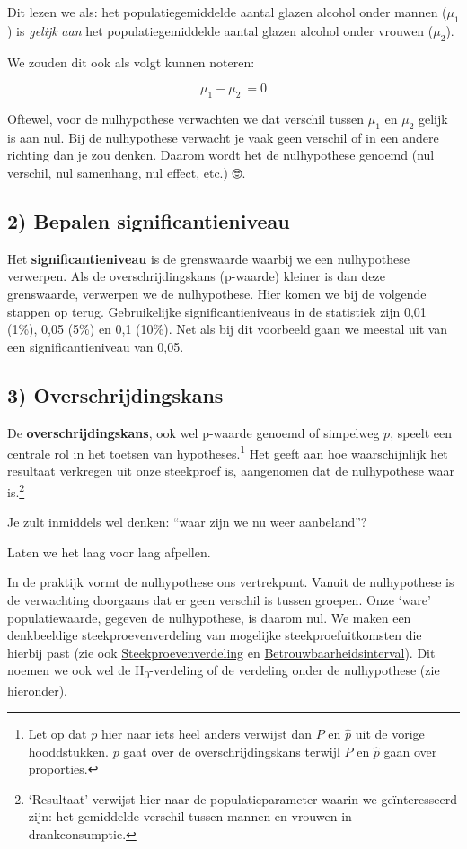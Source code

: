 \documentclass[
  letterpaper,
  DIV=11,
  numbers=noendperiod]{scrreprt}
\begin{document}
Dit lezen we als: het populatiegemiddelde aantal glazen alcohol onder
mannen (\(\mu_1\)) is \emph{gelijk} \emph{aan} het populatiegemiddelde
aantal glazen alcohol onder vrouwen (\(\mu_2\)).

We zouden dit ook als volgt kunnen noteren:

\[\mu_1-\mu_2\ = 0\]

Oftewel, voor de nulhypothese verwachten we dat verschil tussen
\(\mu_1\) en \(\mu_2\) gelijk is aan nul. Bij de nulhypothese verwacht
je vaak geen verschil of in een andere richting dan je zou denken.
Daarom wordt het de nulhypothese genoemd (nul verschil, nul samenhang,
nul effect, etc.) 🤓.

\subsection{2) Bepalen
significantieniveau}\label{bepalen-significantieniveau}

Het \textbf{significantieniveau} is de grenswaarde waarbij we een
nulhypothese verwerpen. Als de overschrijdingskans (p-waarde) kleiner is
dan deze grenswaarde, verwerpen we de nulhypothese. Hier komen we bij de
volgende stappen op terug. Gebruikelijke significantieniveaus in de
statistiek zijn 0,01 (1\%), 0,05 (5\%) en 0,1 (10\%). Net als bij dit
voorbeeld gaan we meestal uit van een significantieniveau van 0,05.

\subsection{3) Overschrijdingskans}\label{sec-overschrijdingskans}

De \textbf{overschrijdingskans}, ook wel p-waarde genoemd of simpelweg
\(p\), speelt een centrale rol in het toetsen van hypotheses.\footnote{Let
  op dat \(p\) hier naar iets heel anders verwijst dan \(P\) en
  \(\hat{p}\) uit de vorige hooddstukken. \(p\) gaat over de
  overschrijdingskans terwijl \(P\) en \(\hat{p}\) gaan over proporties.}
Het geeft aan hoe waarschijnlijk het resultaat verkregen uit onze
steekproef is, aangenomen dat de nulhypothese waar is.\footnote{`Resultaat'
  verwijst hier naar de populatieparameter waarin we geïnteresseerd
  zijn: het gemiddelde verschil tussen mannen en vrouwen in
  drankconsumptie.}

Je zult inmiddels wel denken: ``waar zijn we nu weer aanbeland''?

Laten we het laag voor laag afpellen.

In de praktijk vormt de nulhypothese ons vertrekpunt. Vanuit de
nulhypothese is de verwachting doorgaans dat er geen verschil is tussen
groepen. Onze `ware' populatiewaarde, gegeven de nulhypothese, is daarom
nul. We maken een denkbeeldige steekproevenverdeling van mogelijke
steekproefuitkomsten die hierbij past (zie ook
\hyperref[sec-steekproefcentraallimiet]{Steekproevenverdeling} en
\hyperref[betrouwbaarheidsinterval]{Betrouwbaarheidsinterval}). Dit
noemen we ook wel de H\textsubscript{0}-verdeling of de verdeling onder
de nulhypothese (zie hieronder).
\end{document}
